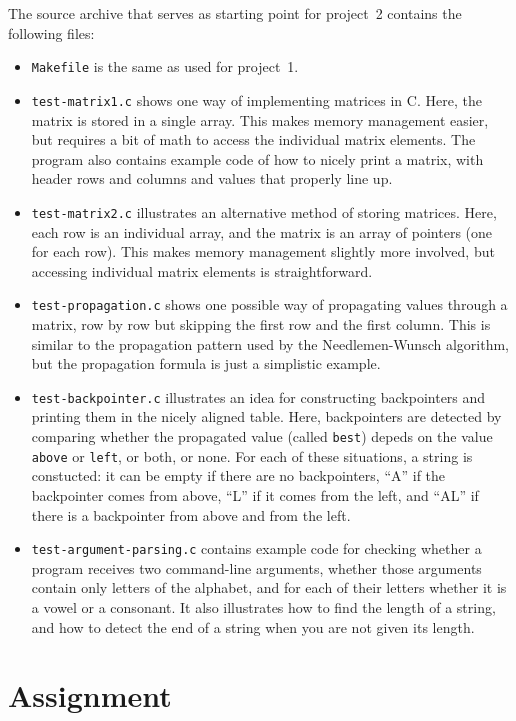 \documentclass[a4paper,10pt]{article}
\begin{document}
The source archive that serves as starting point for project~2 contains the following files:

\begin{itemize}
\item
  \texttt{Makefile} is the same as used for project~1.
\item
  \texttt{test-matrix1.c} shows one way of implementing matrices in C.
  Here, the matrix is stored in a single array.
  This makes memory management easier, but requires a bit of math to access the individual matrix elements.
  The program also contains example code of how to nicely print a matrix, with header rows and columns and values that properly line up.
\item
  \texttt{test-matrix2.c} illustrates an alternative method of storing matrices.
  Here, each row is an individual array, and the matrix is an array of pointers (one for each row).
  This makes memory management slightly more involved, but accessing individual matrix elements is straightforward.
\item
  \texttt{test-propagation.c} shows one possible way of propagating values through a matrix, row by row but skipping the first row and the first column.
  This is similar to the propagation pattern used by the Needlemen-Wunsch algorithm, but the propagation formula is just a simplistic example.
\item
  \texttt{test-backpointer.c} illustrates an idea for constructing backpointers and printing them in the nicely aligned table.
  Here, backpointers are detected by comparing whether the propagated value (called \texttt{best}) depeds on the value \texttt{above} or \texttt{left}, or both, or none.
  For each of these situations, a string is constucted: it can be empty if there are no backpointers, ``A'' if the backpointer comes from above, ``L'' if it comes from the left, and ``AL'' if there is a backpointer from above and from the left.
\item
  \texttt{test-argument-parsing.c} contains example code for checking whether a program receives two command-line arguments, whether those arguments contain only letters of the alphabet, and for each of their letters whether it is a vowel or a consonant.
  It also illustrates how to find the length of a string, and how to detect the end of a string when you are not given its length.
\end{itemize}



\section{Assignment}
\end{document}
